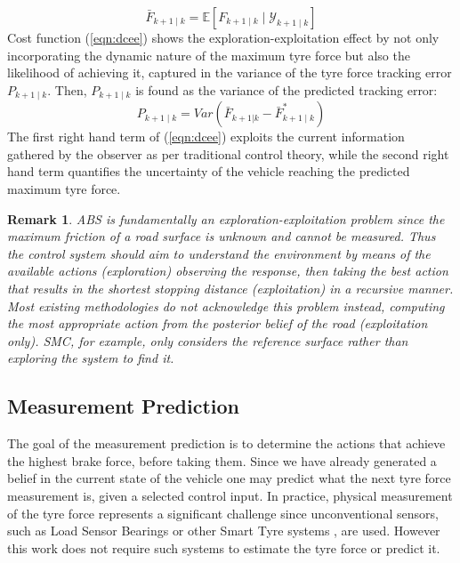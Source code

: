 \documentclass[onecolumn,journal,draftclsnofoot]{IEEEtran}
\newtheorem{remark}{Remark}
\begin{document}
\begin{equation}\label{alg:expF}
    \bar{{F}}_{k+1 \mid k} = \mathbb{E}\left[{F}_{k+1 \mid k} \mid \mathcal{Y}_{k+1 \mid k} \right]
\end{equation}
Cost function (\ref{eqn:dcee}) shows the exploration-exploitation effect by not only incorporating the dynamic nature of the maximum tyre force but also the likelihood of achieving it, captured in the variance of the tyre force tracking error \({P}_{k+1 \mid k}\). 
Then, \(P_{k+1 \mid k}\) is found as the variance of the predicted tracking error:
\begin{equation}
    P_{k+1 \mid k} = Var \left( {\bar{{F}}}_{k+1|k} - \bar{F}_{k+1\mid k}^* \right)
\end{equation}
The first right hand term of (\ref{eqn:dcee}) exploits the current information gathered by the observer as per traditional control theory, while the second right hand term quantifies the uncertainty of the vehicle reaching the predicted maximum tyre force.

\begin{remark} %
ABS is fundamentally an exploration-exploitation problem since the maximum friction of a road surface is unknown and cannot be measured. Thus the control system should aim to understand the environment by means of the available actions (\emph{exploration}) observing the response, then taking the best action that results in the shortest stopping distance (\emph{exploitation}) in a recursive manner. Most existing methodologies do not acknowledge this problem instead, computing the most appropriate action from the posterior belief of the road (exploitation only). SMC, for example, only considers the reference surface rather than exploring the system to find it.
\end{remark}

\subsection{Measurement Prediction}
The goal of the measurement prediction is to determine the actions that achieve the highest brake force, before taking them. Since we have already generated a belief in the current state of the vehicle one may predict what the next tyre force measurement is, given a selected control input. 
In practice, physical measurement of the tyre force represents a significant challenge since unconventional sensors, such as Load Sensor Bearings \cite{Nam2013} or other Smart Tyre systems \cite{Mazzilli2021}, are used. 
However this work does not require such systems to estimate the tyre force or predict it.
\end{document}
